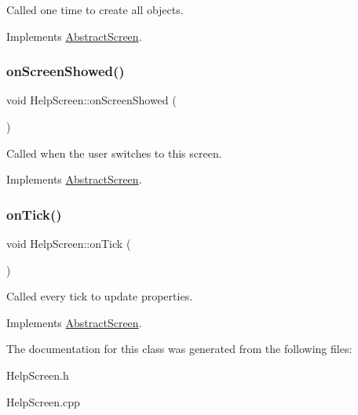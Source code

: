 Called one time to create all objects. 



Implements \mbox{\hyperlink{class_abstract_screen_a7ab389bd33f4824d3d353b5a9e1616de}{Abstract\+Screen}}.

\mbox{\label{class_help_screen_a65d1845f657954d98e60cd042020c518}} 
\subsubsection{\texorpdfstring{on\+Screen\+Showed()}{onScreenShowed()}}
{\footnotesize\ttfamily void Help\+Screen\+::on\+Screen\+Showed (\begin{DoxyParamCaption}{ }\end{DoxyParamCaption})\hspace{0.3cm}{\ttfamily [virtual]}}



Called when the user switches to this screen. 



Implements \mbox{\hyperlink{class_abstract_screen_a219687a34e6aed15a9eaf0d4414d1783}{Abstract\+Screen}}.

\mbox{\label{class_help_screen_acb766ebc2fcf05e146bf808618fa57c6}} 
\subsubsection{\texorpdfstring{on\+Tick()}{onTick()}}
{\footnotesize\ttfamily void Help\+Screen\+::on\+Tick (\begin{DoxyParamCaption}{ }\end{DoxyParamCaption})\hspace{0.3cm}{\ttfamily [virtual]}}



Called every tick to update properties. 



Implements \mbox{\hyperlink{class_abstract_screen_a3861213630fd23d4a3ff392191614ec2}{Abstract\+Screen}}.



The documentation for this class was generated from the following files\+:\begin{DoxyCompactItemize}
\item 
Help\+Screen.\+h\item 
Help\+Screen.\+cpp\end{DoxyCompactItemize}

